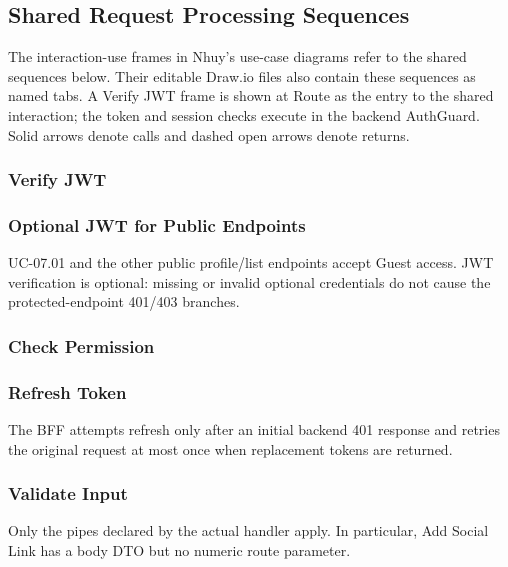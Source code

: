 \subsection{Shared Request Processing Sequences}

The interaction-use frames in Nhuy's use-case diagrams refer to the shared
sequences below. Their editable Draw.io files also contain these sequences as
named tabs. A Verify JWT frame is shown at Route as the entry to the shared
interaction; the token and session checks execute in the backend AuthGuard.
Solid arrows denote calls and dashed open arrows denote returns.

\subsubsection{Verify JWT}

\subsubsection{Optional JWT for Public Endpoints}
UC-07.01 and the other public profile/list endpoints accept Guest access.
JWT verification is optional: missing or invalid optional credentials do not
cause the protected-endpoint 401/403 branches.

\subsubsection{Check Permission}

\subsubsection{Refresh Token}
The BFF attempts refresh only after an initial backend 401 response and retries
the original request at most once when replacement tokens are returned.

\subsubsection{Validate Input}
Only the pipes declared by the actual handler apply. In particular, Add Social
Link has a body DTO but no numeric route parameter.

